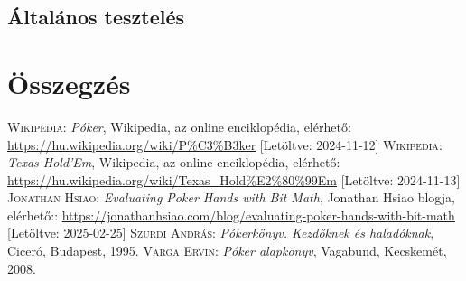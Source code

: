 \documentclass[]{thesis-ekf}
\theoremstyle{definition}
\theoremstyle{remark}
\begin{document}
\section{Általános tesztelés}

\chapter*{Összegzés}

\begin{thebibliography}{2}
	\textsc{Wikipedia}: \emph{Póker}, Wikipedia, az online enciklopédia, elérhető: \url{https://hu.wikipedia.org/wiki/P%C3%B3ker} [Letöltve: 2024-11-12]
	\textsc{Wikipedia}: \emph{Texas Hold'Em}, Wikipedia, az online enciklopédia, elérhető: \url{https://hu.wikipedia.org/wiki/Texas_Hold%E2%80%99Em} [Letöltve: 2024-11-13]
	\textsc{Jonathan Hsiao}: \emph{Evaluating Poker Hands with Bit Math}, Jonathan Hsiao blogja, elérhető:: \url{https://jonathanhsiao.com/blog/evaluating-poker-hands-with-bit-math} [Letöltve: 2025-02-25]
	\textsc{Szurdi András}: \emph{Pókerkönyv. Kezdőknek és haladóknak}, Ciceró, Budapest, 1995.
	\textsc{Varga Ervin}: \emph{Póker alapkönyv}, Vagabund, Kecskemét, 2008.
\end{thebibliography}

%
\end{document}
